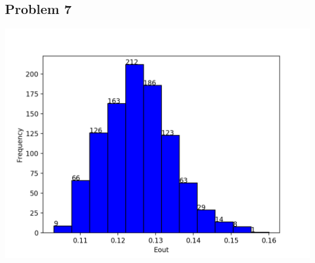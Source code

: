 \documentclass[12pt, a4paper]{article}
\begin{document}
\begin{CJK}{UTF8}{bkai}
	\section*{Problem 7}
		\includegraphics[width=17cm, keepaspectratio=true]{7.png}

	\newpage

\end{CJK}
\end{document}

